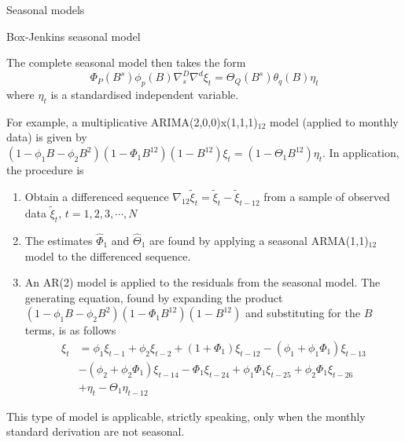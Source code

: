 \documentclass[8pt]{beamer}
\renewcommand{\emph}[1]{\textcolor{myorange}{#1}}
\begin{document}
\begin{frame}{Seasonal models}
    \begin{block}{Box-Jenkins seasonal model}
    \end{block}
    The complete \emph{seasonal model} then takes the form
\begin{equation}
    \Phi_P (B^s) \phi_p (B) \nabla_s^D \nabla^d \xi_t = \Theta_Q (B^s) \theta_q (B) \eta_t
        \label{e457}
    \end{equation}
     where $\eta_t$ is a standardised independent variable.

     For example, a multiplicative \emph{ARIMA(2,0,0)x(1,1,1)$_{12}$} model (applied to monthly data) is given by $(1-\phi_1 B - \phi_2 B^2) (1-\Phi_1 B^{12})(1-B^{12})\xi_t = (1-\Theta_1 B^{12})\eta_t$. In application, the procedure is
     \begin{enumerate}
         \item Obtain a differenced sequence $\nabla_{12} \tilde{\xi}_t = \tilde{\xi}_t - \tilde{\xi}_{t-12}$ from a sample of observed data $\tilde{\xi}_t$, $t=1,2,3, \cdots, N$ 
         \item The estimates $\hat{\Phi}_1$ and $\hat{\Theta}_1$ are found by applying a seasonal \emph{ARMA(1,1)$_{12}$} model to the differenced sequence. 
         \item An \emph{AR(2)} model is applied to the residuals from the seasonal model. The generating equation, found by expanding the product $(1-\phi_1 B - \phi_2 B^2) (1-\Phi_1 B^{12})(1-B^{12})$ and substituting for the $B$ terms, is as follows 
             \begin{align*}
                 \xi_t &= \phi_1 \xi_{t-1} + \phi_2 \xi_{t-2} + (1+\Phi_1) \xi_{t-12} - (\phi_1 + \phi_1 \Phi_1)\xi_{t-13} \\
                       &- (\phi_2 + \phi_2 \Phi_1) \xi_{t-14} - \Phi_1 \xi_{t-24} + \phi_1 \Phi_1 \xi_{t-25} + \phi_2 \Phi_1 \xi_{t-26} \\
                       &+ \eta_t - \Theta_1 \eta_{t-12}
             \end{align*}
     \end{enumerate}
     This type of model is applicable, strictly speaking, only when the \emph{monthly standard derivation} are \emph{not seasonal}. 
\end{frame}
 
\end{document}
